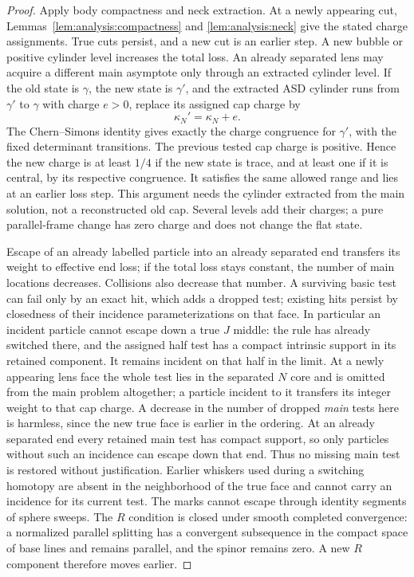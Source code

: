 \begin{proof}
Apply body compactness and neck extraction.  At a newly appearing cut,
Lemmas~\ref{lem:analysis:compactness} and \ref{lem:analysis:neck}
give the stated charge assignments.  True cuts persist, and a
new cut is an earlier step.  A new bubble or positive cylinder level
increases the total loss.  An already separated lens may acquire a
different main asymptote only through an extracted cylinder level.
If the old state is $\gamma$, the new state is $\gamma'$, and the
extracted ASD cylinder runs from $\gamma'$ to $\gamma$ with charge
$e>0$, replace its assigned cap charge by
\begin{equation}\label{eq:analysis:cap-charge-transfer}
 \kappa_N'=\kappa_N+e.
\end{equation}
The Chern--Simons identity gives exactly the charge congruence for
$\gamma'$, with the fixed determinant transitions.  The previous
tested cap charge is positive.  Hence the new charge is at least
$1/4$ if the new state is trace, and at least one if it is central,
by its respective congruence.  It satisfies the same allowed range
and lies at an earlier loss step.  This argument needs the cylinder
extracted from the main solution, not a reconstructed old cap.
Several levels add their charges; a pure parallel-frame change has
zero charge and does not change the flat state.

Escape of an already labelled particle into
an already separated end transfers its weight to effective end loss;
if the total loss stays constant, the number of main locations
decreases.  Collisions also decrease that number.  A surviving basic
test can fail only by an exact hit, which adds a dropped test; existing
hits persist by closedness of their incidence parameterizations on
that face.  In particular an incident particle cannot escape down a
true $J$ middle: the rule has already switched there, and the assigned
half test has a compact intrinsic support in its retained component.
It remains incident on that half in the limit.  At a newly appearing
lens face the whole test lies in the separated $N$ core and is
omitted from the main problem altogether; a particle incident to it
transfers its integer weight to that cap charge.  A decrease in the
number of dropped \emph{main} tests here is harmless, since the
new true face is earlier in the ordering.  At an already separated
end every retained main test has compact support, so only particles
without such an incidence can escape down that end.  Thus no missing
main test is restored without justification.  Earlier whiskers used
during a switching homotopy are absent in the neighborhood of the
true face and cannot carry an incidence for its current test.
The marks cannot escape through identity segments of sphere sweeps.
The $R$ condition is closed under smooth completed convergence: a
normalized parallel splitting has a convergent subsequence in the
compact space of base lines and remains parallel, and the spinor
remains zero.  A new $R$ component therefore moves earlier.


\end{proof}
